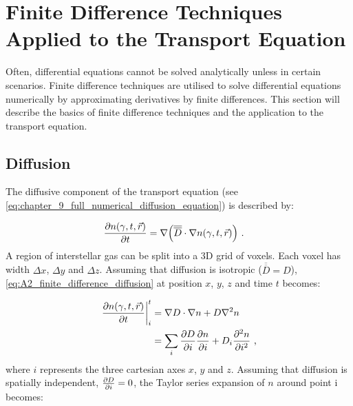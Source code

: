 \chapter{Finite Difference Techniques Applied to the Transport Equation} \label{sec:A2_finite_difference}

Often, differential equations cannot be solved analytically unless in certain scenarios. Finite difference techniques are utilised to solve differential equations numerically by approximating derivatives by finite differences. This section will describe the basics of finite difference techniques and the application to the transport equation.

\section{Diffusion} \label{sec:A2_diffusion}

The diffusive component of the transport equation (see \autoref{eq:chapter_9_full_numerical_diffusion_equation}) is described by:

\begin{equation}
    \begin{aligned}
    \pdv{n\qty(\gamma,t,\vec{r})}{t}&=\nabla \qty(\overline{\overline{D}}\cdot\nabla n\qty(\gamma,t,\vec{r}))\text{ .} 
    \end{aligned} \label{eq:A2_finite_difference_diffusion}
\end{equation}
\noindent A region of interstellar gas can be split into a 3D grid of voxels. Each voxel has width $\Delta x$, $\Delta y$ and $\Delta z$. Assuming that diffusion is isotropic ($\overline{\overline{D}}=D$), \autoref{eq:A2_finite_difference_diffusion} at position $x$, $y$, $z$ and time $t$ becomes:

\begin{equation}
    \begin{aligned}
    \pdv{n\qty(\gamma,t,\vec{r})}{t}\bigg|_{i}^t &= \nabla D\cdot\nabla n + D\nabla^2 n \\
    &= \sum_{i} \pdv{D}{i}\pdv{n}{i}+ D_i\pdv[2]{n}{i}\text{ ,} 
    \end{aligned} \label{eq:A2_finite_difference_diffusion_expanded}
\end{equation}
\noindent where $i$ represents the three cartesian axes $x$, $y$ and $z$. Assuming that diffusion is spatially independent, $\pdv{D}{i}=0$, the Taylor series expansion of $n$ around point i becomes:

